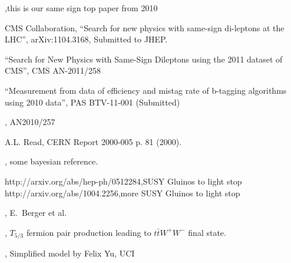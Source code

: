\begin{thebibliography}{99}

,{this is our same sign top paper from 2010}

 {CMS Collaboration, ``Search for new physics with same-sign di-leptons at the LHC''}, arXiv:1104.3168, Submitted to JHEP.

 {``Search for New Physics with Same-Sign Dileptons using the 2011 dataset of CMS''}, CMS AN-2011/258

 {``Measurement from data of efficiency and mistag rate of b-tagging algorithms using 2010 data''}, PAS BTV-11-001 (Submitted)

, AN2010/257

 {A.L. Read, CERN Report 2000-005 p. 81 (2000).}

, some bayesian reference.

 { http://arxiv.org/abs/hep-ph/0512284},{SUSY Gluinos to light stop}
 { http://arxiv.org/abs/1004.2256},{more SUSY Gluinos to light stop}

, {E.~Berger et al.}

, { $T_{5/3}$ fermion pair production leading to $t\bar{t}W^+W^-$ final state.}

,{ Simplified model by Felix Yu, UCI}

\end{thebibliography}








